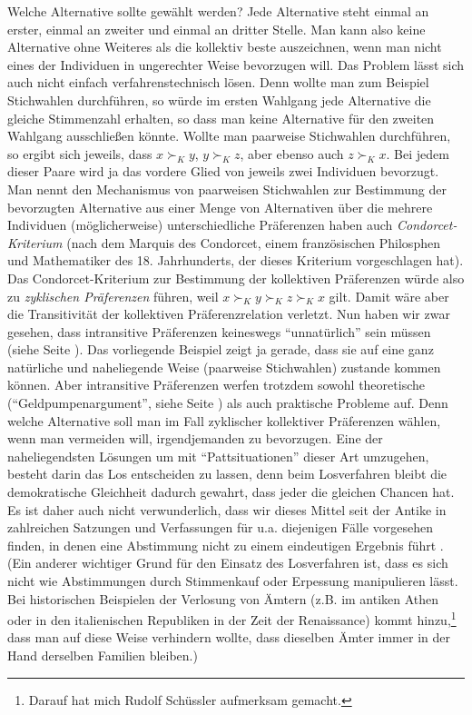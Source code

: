 Welche Alternative sollte gewählt werden? Jede Alternative steht einmal an
erster, einmal an zweiter und einmal an dritter Stelle. Man kann also keine
Alternative ohne Weiteres als die kollektiv beste auszeichnen, wenn man nicht
eines der Individuen in ungerechter Weise bevorzugen will. Das Problem lässt sich
auch nicht einfach verfahrenstechnisch lösen. Denn wollte man zum Beispiel
Stichwahlen durchführen, so würde im ersten Wahlgang jede Alternative die gleiche
Stimmenzahl erhalten, so dass man keine Alternative für den zweiten Wahlgang
ausschließen könnte. Wollte man paarweise Stichwahlen durchführen, so ergibt sich
jeweils, dass $x \succ_K y$, $y \succ_K z$, aber ebenso auch $z \succ_K x$. Bei
jedem dieser Paare wird ja das vordere Glied von jeweils zwei Individuen
bevorzugt. Man nennt den Mechanismus von
paarweisen Stichwahlen zur Bestimmung der bevorzugten Alternative aus einer Menge
von Alternativen über die mehrere Individuen (möglicherweise) unterschiedliche
Präferenzen haben auch {\em Condorcet-Kriterium} (nach dem Marquis des Condorcet,
einem französischen Philosphen und Mathematiker des 18. Jahrhunderts, der dieses
Kriterium vorgeschlagen hat). Das Condorcet-Kriterium zur Bestimmung der
kollektiven Präferenzen würde also zu {\em zyklischen Präferenzen} führen, weil
$x \succ_K y \succ_K z \succ_K x$ gilt.  Damit
wäre aber die Transitivität der kollektiven Präferenzrelation verletzt. Nun haben
wir zwar gesehen, dass intransitive Präferenzen keineswegs "`unnatürlich"' sein
müssen (siehe Seite \pageref{intransitivePraeferenzen}). Das vorliegende Beispiel
zeigt ja gerade, dass sie auf eine ganz natürliche und naheliegende Weise
(paarweise Stichwahlen) zustande kommen können. Aber intransitive Präferenzen
werfen trotzdem sowohl theoretische ("`Geldpumpenargument"', siehe Seite
\pageref{Geldpumpenargument}) als auch praktische Probleme auf. Denn welche
Alternative soll man im Fall zyklischer kollektiver Präferenzen wählen, wenn man
vermeiden will, irgendjemanden zu bevorzugen. Eine der naheliegendsten Lösungen
um mit "`Pattsituationen"' dieser Art umzugehen, besteht darin das Los
entscheiden zu lassen, denn beim Losverfahren bleibt die demokratische Gleichheit dadurch
gewahrt, dass jeder die gleichen Chancen hat. Es ist daher auch nicht verwunderlich, dass wir dieses
Mittel seit der Antike in zahlreichen Satzungen und Verfassungen für
u.a. diejenigen Fälle vorgesehen finden, in denen eine Abstimmung nicht zu einem
eindeutigen Ergebnis führt \cite[]{delong:1991}. (Ein anderer wichtiger Grund
für den Einsatz des Losverfahren ist, dass es sich nicht wie Abstimmungen durch
Stimmenkauf oder Erpessung manipulieren lässt. Bei historischen Beispielen der
Verlosung von Ämtern (z.B. im antiken Athen oder in den italienischen Republiken
in der Zeit der Renaissance) kommt hinzu,\footnote{Darauf hat mich Rudolf
Schüssler aufmerksam gemacht.} dass man auf diese Weise verhindern wollte, dass
dieselben Ämter immer in der Hand derselben Familien bleiben.)

